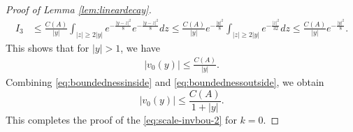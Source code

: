\documentclass[12pt]{amsart}
\numberwithin{equation}{section}              %
\theoremstyle{remark}
\begin{document}
\begin{proof}[Proof of Lemma \ref{lem:lineardecay}]
        \begin{equation*}
			\begin{aligned}
            I_3 &\leq  \frac{C(A)}{|y|}   \int_{|z|\geq 2|y|} e^{-\frac{|y-z|^2}{8}} e^{-\frac{|y-z|^2}{8}} dz
            \leq
            \frac{C(A)}{|y|}  e^{-\frac{|y|^2}{8}} \int_{|z|\geq 2|y|} e^{-\frac{|z|^2}{32}} dz \leq \frac{C(A)}{|y|}  e^{-\frac{|y|^2}{8}}.
            \end{aligned}           
		\end{equation*}
        This shows that for $|y|>1$, we have
        \begin{equation}\label{eq:boundednessoutside}
            \begin{aligned}
             |v_0(y)|\leq \frac{C(A)}{|y|}.   
            \end{aligned}
        \end{equation}
        Combining \eqref{eq:boundednessinside} and \eqref{eq:boundednessoutside}, we obtain 
        \begin{equation*}
            |v_0(y)|\leq \frac{C(A)}{1+|y|}.   
        \end{equation*}
    This completes the proof of the \eqref{eq:scale-invbou-2} for $k=0$.     
  

\end{proof}
\end{document}
